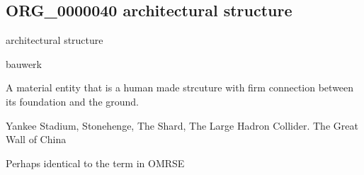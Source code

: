 \documentclass[letterpaper,10pt,english]{sphinxmanual}
\begin{document}
\subsection{ORG\_0000040 \sphinxhyphen{} architectural structure}
\label{\detokenize{doc-ORG_0000040:org-0000040-architectural-structure}}\label{\detokenize{doc-ORG_0000040:index-0}}\label{\detokenize{doc-ORG_0000040::doc}}
\begin{sphinxShadowBox}

\sphinxAtStartPar
architectural structure
\end{sphinxShadowBox}

\begin{sphinxShadowBox}

\sphinxAtStartPar
bauwerk
\end{sphinxShadowBox}

\begin{sphinxShadowBox}

\sphinxAtStartPar
{\hyperref[\detokenize{doc-BFO_0000040::doc}]{}}
\end{sphinxShadowBox}

\begin{sphinxShadowBox}

\sphinxAtStartPar
A material entity that is a human made strcuture with firm connection between its foundation and the ground.
\end{sphinxShadowBox}

\begin{sphinxShadowBox}

\sphinxAtStartPar
{}
\end{sphinxShadowBox}

\begin{sphinxShadowBox}

\sphinxAtStartPar
Yankee Stadium, Stonehenge, The Shard, The Large Hadron Collider. The Great Wall of China
\end{sphinxShadowBox}

\begin{sphinxShadowBox}

\sphinxAtStartPar
Perhaps identical to the term in OMRSE
\end{sphinxShadowBox}
\end{document}
